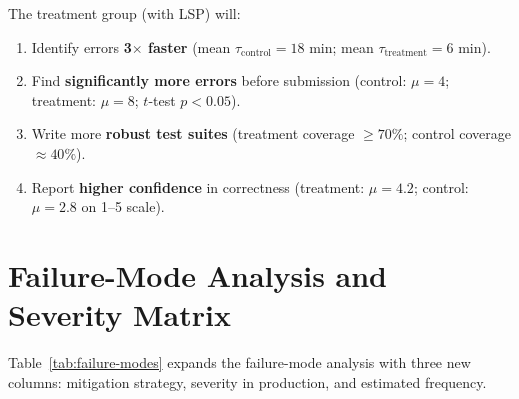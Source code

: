 \documentclass[12pt, letterpaper]{report}
\theoremstyle{plain}
\theoremstyle{definition}
\theoremstyle{remark}
\begin{document}
\begin{hypothesis}
The treatment group (with LSP) will:
\begin{enumerate}
  \item Identify errors \textbf{3$\times$ faster} (mean $\tau_{\mathrm{control}} = 18$ min;
        mean $\tau_{\mathrm{treatment}} = 6$ min).
  \item Find \textbf{significantly more errors} before submission
        (control: $\mu = 4$; treatment: $\mu = 8$; $t$-test $p < 0.05$).
  \item Write more \textbf{robust test suites} (treatment coverage $\geq 70\%$;
        control coverage $\approx 40\%$).
  \item Report \textbf{higher confidence} in correctness
        (treatment: $\mu = 4.2$; control: $\mu = 2.8$ on 1--5 scale).
\end{enumerate}
\end{hypothesis}

\section{Failure-Mode Analysis and Severity Matrix}

Table~\ref{tab:failure-modes} expands the failure-mode analysis with three
new columns: mitigation strategy, severity in production, and estimated frequency.
\end{document}
